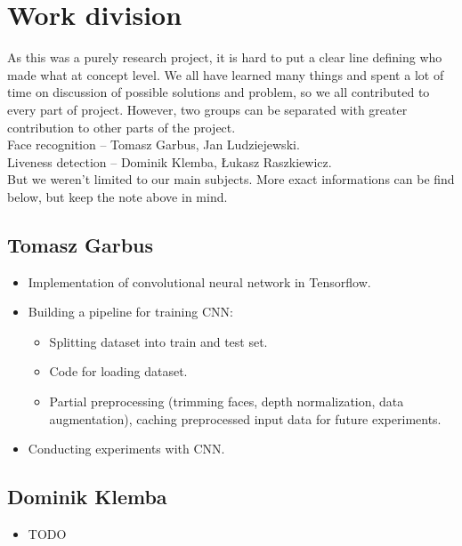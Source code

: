 \chapter{Work division}
    As this was a purely research project, it is hard to
    put a clear line defining who made what at concept level.
    We all have learned many things and spent a lot of time
    on discussion of possible solutions and problem,
    so we all contributed to every part of project.
    However, two groups can be separated
    with greater contribution to other parts of the project.\\
    Face recognition -- Tomasz Garbus, Jan Ludziejewski.\\
    Liveness detection -- Dominik Klemba, Łukasz Raszkiewicz.\\
    But we weren't limited to our main subjects.
    More exact informations can be find below, but keep the note above in mind.

    \section{Tomasz Garbus}
        \begin{itemize}
            \item Implementation of convolutional neural network in Tensorflow.
            \item Building a pipeline for training CNN:
            \begin{itemize}
                \item Splitting dataset into train and test set.
                \item Code for loading dataset.
                \item Partial preprocessing (trimming faces, depth normalization,
                      data augmentation), caching preprocessed input data for future experiments.
            \end{itemize}
            \item Conducting experiments with CNN.
        \end{itemize}

    \section{Dominik Klemba}
        \begin{itemize}
            \item TODO
        \end{itemize}

